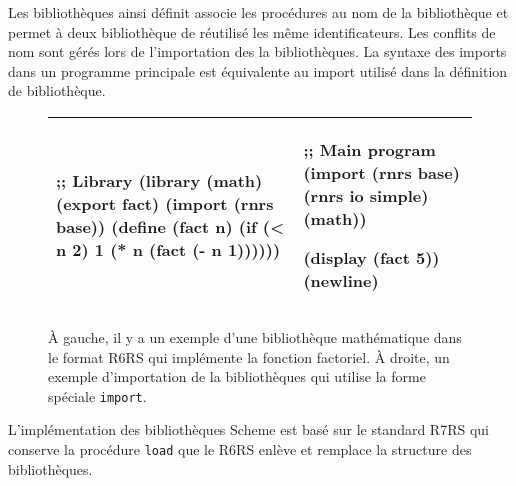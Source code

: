 Les bibliothèques ainsi définit associe les procédures au nom de la bibliothèque
et permet à deux bibliothèque de réutilisé les même identificateurs. Les conflits de
nom sont gérés lors de l'importation des la bibliothèques. La syntaxe des imports dans
un programme principale est équivalente au import utilisé dans la définition de
bibliothèque.

\begin{center}
  \begin{figure}[h]
  \begin{tabular}{|l|l|}
\hline
\begin{mplisting}{0.5}
;; Library
(library (math)
  (export fact)
  (import (rnrs base))
  (define (fact n)
    (if (< n 2)
      1
      (* n (fact (- n 1))))))
\end{mplisting} &
\begin{mplisting}{0.5}
;; Main program
(import
  (rnrs base)
  (rnrs io simple)
  (math))

(display (fact 5))
(newline)
\end{mplisting}\\\hline
  \end{tabular}
\caption{À gauche, il y a un exemple d'une bibliothèque mathématique dans le format R6RS qui implémente
la fonction factoriel. À droite, un exemple d'importation de la bibliothèques qui utilise la forme
spéciale \texttt{import}.}
\end{figure}
\end{center}


L'implémentation des bibliothèques Scheme est basé sur le standard R7RS qui conserve
la procédure \texttt{load} que le R6RS enlève et remplace la structure des bibliothèques.
